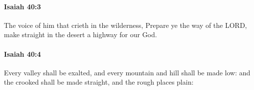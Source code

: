 		\paragraph{Isaiah 40:3} %
			\label{ISAIAH-40-3}

			The voice of him that crieth in the wilderness, Prepare ye the way of the LORD, make straight in the desert a highway for our God.

			\begin{framed}
			\scriptsize
				\begin{compactdesc}
					\item[BHS] 
					\item[LXX] 
				\end{compactdesc}
			\end{framed}

		\paragraph{Isaiah 40:4} %
			\label{ISAIAH-40-4}

			Every valley shall be exalted, and every mountain and hill shall be made low: and the crooked shall be made straight, and the rough places plain:

